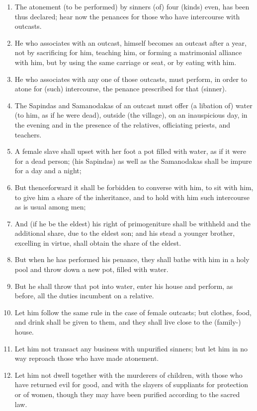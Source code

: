 \begin{enumerate}
\item The atonement (to be performed) by sinners (of) four (kinds) even, has been thus declared; hear now the penances for those who have intercourse with outcasts.
\item He who associates with an outcast, himself becomes an outcast after a year, not by sacrificing for him, teaching him, or forming a matrimonial alliance with him, but by using the same carriage or seat, or by eating with him.
\item He who associates with any one of those outcasts, must perform, in order to atone for (such) intercourse, the penance prescribed for that (sinner).
\item The Sapindas and Samanodakas of an outcast must offer (a libation of) water (to him, as if he were dead), outside (the village), on an inauspicious day, in the evening and in the presence of the relatives, officiating priests, and teachers.
\item A female slave shall upset with her foot a pot filled with water, as if it were for a dead person; (his Sapindas) as well as the Samanodakas shall be impure for a day and a night;
\item But thenceforward it shall be forbidden to converse with him, to sit with him, to give him a share of the inheritance, and to hold with him such intercourse as is usual among men;
\item And (if he be the eldest) his right of primogeniture shall be withheld and the additional share, due to the eldest son; and his stead a younger brother, excelling in virtue, shall obtain the share of the eldest.
\item But when he has performed his penance, they shall bathe with him in a holy pool and throw down a new pot, filled with water.
\item But he shall throw that pot into water, enter his house and perform, as before, all the duties incumbent on a relative.
\item Let him follow the same rule in the case of female outcasts; but clothes, food, and drink shall be given to them, and they shall live close to the (family-) house.
\item Let him not transact any business with unpurified sinners; but let him in no way reproach those who have made atonement.
\item Let him not dwell together with the murderers of children, with those who have returned evil for good, and with the slayers of suppliants for protection or of women, though they may have been purified according to the sacred law.

\end{enumerate}
